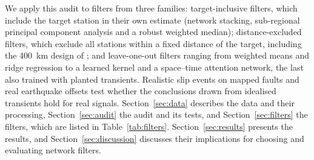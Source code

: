 \documentclass[preprint,12pt,authoryear]{elsarticle}
\begin{document}
We apply this audit to filters from three families: target-inclusive filters, which include the target station in their own estimate (network stacking, sub-regional principal component analysis and a robust weighted median); distance-excluded filters, which exclude all stations within a fixed distance of the target, including the 400~km design of \citet{bachelot2025}; and leave-one-out filters ranging from weighted means and ridge regression to a learned kernel and a space--time attention network, the last also trained with planted transients. Realistic slip events on mapped faults and real earthquake offsets test whether the conclusions drawn from idealised transients hold for real signals. Section~\ref{sec:data} describes the data and their processing, Section~\ref{sec:audit} the audit and its tests, and Section~\ref{sec:filters} the filters, which are listed in Table~\ref{tab:filters}. Section~\ref{sec:results} presents the results, and Section~\ref{sec:discussion} discusses their implications for choosing and evaluating network filters.

\end{document}
